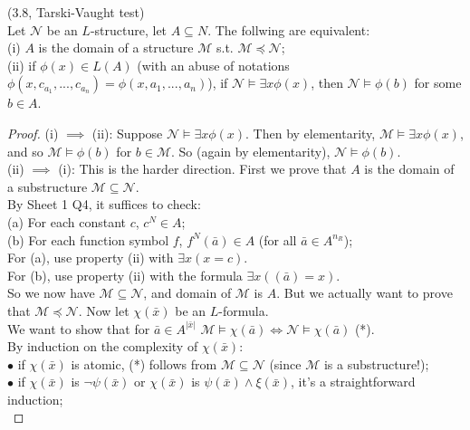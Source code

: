 \documentclass[a4paper]{article}
\begin{document}
\begin{lemma} (3.8, Tarski-Vaught test)\\
    Let $\mathcal{N}$ be an $L$-structure, let $A \subseteq N$. The follwing are equivalent:\\
    (i) $A$ is the domain of a structure $\mathcal{M}$ s.t. $\mathcal{M} \preccurlyeq \mathcal{N}$;\\
    (ii) if $\phi(x) \in L(A)$ (with an abuse of notations $\phi(x,c_{a_1},...,c_{a_n}) = \phi(x,a_1,...,a_n)$), if $\mathcal{N} \vDash \exists x \phi(x)$, then $\mathcal{N} \vDash \phi(b)$ for some $b \in A$.
    \begin{proof}
        (i) $\implies$ (ii): Suppose $\mathcal{N} \vDash \exists x \phi(x)$. Then by elementarity, $\mathcal{M} \vDash \exists x \phi(x)$, and so $\mathcal{M} \vDash \phi(b)$ for $b \in \mathcal{M}$. So (again by elementarity), $\mathcal{N} \vDash \phi(b)$.\\
        (ii) $\implies$ (i): This is the harder direction. First we prove that $A$ is the domain of a substructure $\mathcal{M} \subseteq \mathcal{N}$.\\
        By Sheet 1 Q4, it suffices to check:\\
        (a) For each constant $c$, $c^N \in A$;\\
        (b) For each function symbol $f$, $f^N(\bar{a}) \in A$ (for all $\bar{a} \in A^{n_R}$);\\
        For (a), use property (ii) with $\exists x (x=c)$.\\
        For (b), use property (ii) with the formula $\exists x ((\bar{a}) = x)$.\\
        So we now have $\mathcal{M} \subseteq \mathcal{N}$, and domain of $\mathcal{M}$ is $A$. But we actually want to prove that $\mathcal{M} \preccurlyeq \mathcal{N}$. Now let $\chi(\bar{x})$ be an $L$-formula.\\
        We want to show that for $\bar{a} \in A^{|\bar{x}|}$ $\mathcal{M} \vDash \chi(\bar{a}) \iff \mathcal{N} \vDash \chi(\bar{a})$ (*).\\
        By induction on the complexity of $\chi(\bar{x})$:\\
        $\bullet$ if $\chi(\bar{x})$ is atomic, (*) follows from $\mathcal{M} \subseteq \mathcal{N}$ (since $\mathcal{M}$ is a substructure!);\\
        $\bullet$ if $\chi(\bar{x})$ is $\neg \psi(\bar{x})$ or $\chi(\bar{x})$ is $\psi(\bar{x})\wedge \xi(\bar{x})$, it's a straightforward induction;\\

\end{proof}
\end{lemma}
\end{document}
